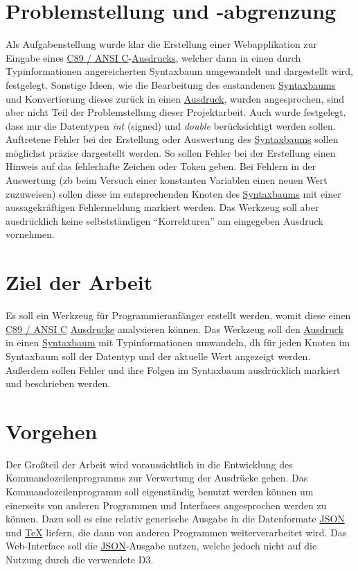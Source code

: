 \documentclass[oneside]{ausarbeitung}
\begin{document}
\section{Problemstellung und -abgrenzung}
\label{sec:problemstellung}

Als Aufgabenstellung wurde klar die Erstellung einer Webapplikation zur Eingabe eines \hyperref[sub:c89]{C89 / ANSI C}-\hyperref[sub:expression]{Ausdrucks}, welcher dann in einen durch Typinformationen angereicherten Syntaxbaum umgewandelt und dargestellt wird, festgelegt. Sonstige Ideen, wie die Bearbeitung des enstandenen \hyperref[sub:syntax_tree]{Syntaxbaums} und Konvertierung dieses zurück in einen \hyperref[sub:expression]{Ausdruck}, wurden angesprochen, sind aber nicht Teil der Problemstellung dieser Projektarbeit. Auch wurde festgelegt, dass nur die Datentypen \textit{int} (signed) und \textit{double} berücksichtigt werden sollen. Auftretene Fehler bei der Erstellung oder Auswertung des \hyperref[sub:syntax_tree]{Syntaxbaums} sollen möglichst präzise dargestellt werden. So sollen Fehler bei der Erstellung einen Hinweis auf das fehlerhafte Zeichen oder Token geben. Bei Fehlern in der Auswertung (\ac{zb} beim Versuch einer konstanten Variablen einen neuen Wert zuzuweisen) sollen diese im entsprechenden Knoten des \hyperref[sub:syntax_tree]{Syntaxbaums} mit einer aussagekräftigen Fehlermeldung markiert werden. Das Werkzeug soll aber ausdrücklich keine selbstständigen "`Korrekturen"' am eingegeben Ausdruck vornehmen.

\section{Ziel der Arbeit}
\label{sec:ziel}

Es soll ein Werkzeug für Programmieranfänger erstellt werden, womit diese einen \hyperref[sub:c89]{C89 / ANSI C} \hyperref[sub:expression]{Ausdrucke} analysieren können. Das Werkzeug soll den \hyperref[sub:expression]{Ausdruck} in einen \hyperref[sub:syntax_tree]{Syntaxbaum} mit Typinformationen umwandeln, \ac{dh} für jeden Knoten im Syntaxbaum soll der Datentyp und der aktuelle Wert angezeigt werden. Außerdem sollen Fehler und ihre Folgen im Syntaxbaum ausdrücklich markiert und beschrieben werden.

\section{Vorgehen}
\label{sec:vorgehen}

Der Großteil der Arbeit wird voraussichtlich in die Entwicklung des Kommandozeilenprogramms zur Verwertung der Ausdrücke gehen. Das Kommandozeilenprogramm soll eigenständig benutzt werden können um einerseits von anderen Programmen und Interfaces angesprochen werden zu können. Dazu soll es eine relativ generische Ausgabe in die Datenformate \hyperref[sub:json]{JSON} und \hyperref[sub:tex]{TeX} liefern, die dann von anderen Programmen weiterverarbeitet wird. Das Web-Interface soll die \hyperref[sub:json]{JSON}-Ausgabe nutzen, welche jedoch nicht auf die Nutzung durch die verwendete D3.
\end{document}
